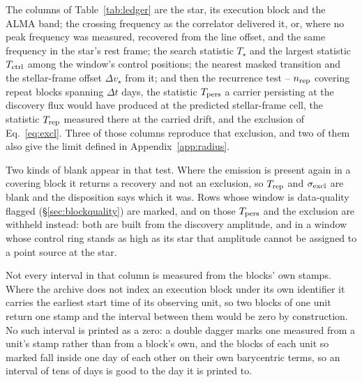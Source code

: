 The columns of Table~\ref{tab:ledger} are the star, its execution block and
the ALMA band; the crossing frequency as the correlator delivered it, or,
where no peak frequency was measured, recovered from the line offset, and the
same frequency in the star's rest frame; the search statistic $T_\star$ and
the largest statistic $T_{\rm ctrl}$ among the window's \NCtrl{} control
positions; the nearest masked transition and the stellar-frame offset
$\Delta v_\star$ from it; and then the recurrence test -- $n_{\rm rep}$
covering repeat blocks spanning $\Delta t$ days, the statistic $T_{\rm pers}$
a carrier persisting at the discovery flux would have produced at the
predicted stellar-frame cell, the statistic $T_{\rm rep}$ measured there at
the carried drift, and the exclusion of Eq.~\ref{eq:excl}. Three of those
columns reproduce that exclusion, and two of them also give the limit defined
in Appendix~\ref{app:radius}.

Two kinds of blank appear in that test. Where the emission is present again in
a covering block it returns a recovery and not an exclusion, so
$T_{\rm rep}$ and $\sigma_{\rm excl}$ are blank and the disposition says which
it was. Rows whose window is data-quality flagged
(\S\ref{sec:blockquality}) are marked, and on those $T_{\rm pers}$ and the
exclusion are withheld instead: both are built from the discovery amplitude,
and in a window whose control ring stands as high as its star that amplitude
cannot be assigned to a point source at the star.

Not every interval in that column is measured from the blocks' own stamps.
Where the archive does not
index an execution block under its own identifier it carries the earliest
start time of its observing unit, so two blocks of one unit return one stamp
and the interval between them would be zero by construction. No such interval
is printed as a zero: a double dagger marks one measured from a unit's stamp
rather than from a block's own, and the blocks of
each unit so marked fall inside one day of each other on their own
barycentric terms, so an interval of tens of days is good to the day it is
printed to.

